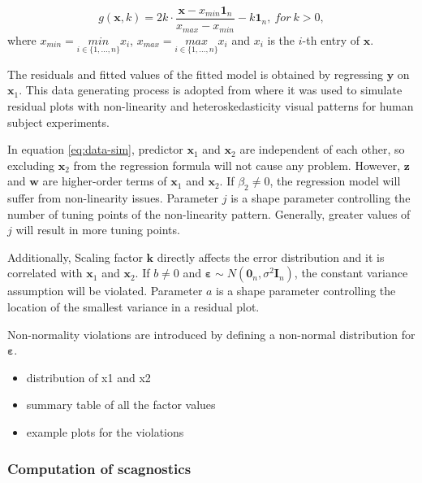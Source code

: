 \documentclass[]{interact}
\theoremstyle{plain}%
\theoremstyle{definition}
\theoremstyle{remark}
\providecommand{\tightlist}{%
  \setlength{\itemsep}{0pt}\setlength{\parskip}{0pt}}
\def\tightlist{}
\begin{document}
\[g(\boldsymbol{x}, k) = 2k \cdot \frac{\boldsymbol{x} - x_{min}\boldsymbol{1}_n}{x_{max} - x_{min}} - k\boldsymbol{1}_n,~for~k > 0,\]
\noindent where \(x_{min} = \underset{i \in \{ 1,...,n\}}{min} x_i\),
\(x_{max} = \underset{i \in \{ 1,...,n\}}{max} x_i\) and \(x_i\) is the
\(i\)-th entry of \(\boldsymbol{x}\).

The residuals and fitted values of the fitted model is obtained by
regressing \(\boldsymbol{y}\) on \(\boldsymbol{x}_1\). This data
generating process is adopted from \citet{li2023plot} where it was used
to simulate residual plots with non-linearity and heteroskedasticity
visual patterns for human subject experiments.

In equation \ref{eq:data-sim}, predictor \(\boldsymbol{x}_1\) and
\(\boldsymbol{x}_2\) are independent of each other, so excluding
\(\boldsymbol{x}_2\) from the regression formula will not cause any
problem. However, \(\boldsymbol{z}\) and \(\boldsymbol{w}\) are
higher-order terms of \(\boldsymbol{x}_1\) and \(\boldsymbol{x}_2\). If
\(\beta_2 \neq 0\), the regression model will suffer from non-linearity
issues. Parameter \(j\) is a shape parameter controlling the number of
tuning points of the non-linearity pattern. Generally, greater values of
\(j\) will result in more tuning points.

Additionally, Scaling factor \(\boldsymbol{k}\) directly affects the
error distribution and it is correlated with \(\boldsymbol{x}_1\) and
\(\boldsymbol{x}_2\). If \(b \neq 0\) and
\(\boldsymbol{\varepsilon} \sim N(\boldsymbol{0}_n, \sigma^2\boldsymbol{I}_n)\),
the constant variance assumption will be violated. Parameter \(a\) is a
shape parameter controlling the location of the smallest variance in a
residual plot.

Non-normality violations are introduced by defining a non-normal
distribution for \(\boldsymbol{\varepsilon}\).

\begin{itemize}
\tightlist
\item
  distribution of x1 and x2
\item
  summary table of all the factor values
\item
  example plots for the violations
\end{itemize}

\hypertarget{computation-of-scagnostics}{%
\subsubsection{Computation of
scagnostics}\label{computation-of-scagnostics}}
\end{document}
